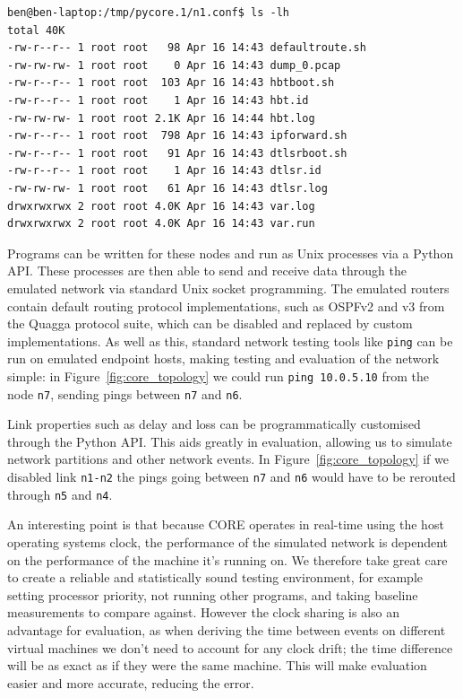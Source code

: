 \documentclass[withindex,glossary,openany]{cam-thesis}
\begin{document}
\begin{minipage}{1\textwidth} \centering
\begin{lstlisting}[label=core_filesystem, frame=tb, caption=Virtualised file-system of the node \texttt{n1}]
ben@ben-laptop:/tmp/pycore.1/n1.conf$ ls -lh
total 40K
-rw-r--r-- 1 root root   98 Apr 16 14:43 defaultroute.sh
-rw-rw-rw- 1 root root    0 Apr 16 14:43 dump_0.pcap
-rw-r--r-- 1 root root  103 Apr 16 14:43 hbtboot.sh
-rw-r--r-- 1 root root    1 Apr 16 14:43 hbt.id
-rw-rw-rw- 1 root root 2.1K Apr 16 14:44 hbt.log
-rw-r--r-- 1 root root  798 Apr 16 14:43 ipforward.sh
-rw-r--r-- 1 root root   91 Apr 16 14:43 dtlsrboot.sh
-rw-r--r-- 1 root root    1 Apr 16 14:43 dtlsr.id
-rw-rw-rw- 1 root root   61 Apr 16 14:43 dtlsr.log
drwxrwxrwx 2 root root 4.0K Apr 16 14:43 var.log
drwxrwxrwx 2 root root 4.0K Apr 16 14:43 var.run
\end{lstlisting}
\end{minipage}

Programs can be written for these nodes and run as Unix processes via a Python API. These processes are then able to send and receive data through the emulated network via standard Unix socket programming. The emulated routers contain default routing protocol implementations, such as OSPFv2 and v3 from the Quagga protocol suite, which can be disabled and replaced by custom implementations. As well as this, standard network testing tools like \texttt{ping} can be run on emulated endpoint hosts, making testing and evaluation of the network simple: in Figure~\ref{fig:core_topology} we could run \texttt{ping 10.0.5.10} from the node \texttt{n7}, sending pings between \texttt{n7} and \texttt{n6}.

Link properties such as delay and loss can be programmatically customised through the Python API. This aids greatly in evaluation, allowing us to simulate network partitions and other network events. In Figure~\ref{fig:core_topology} if we disabled link \texttt{n1-n2} the pings going between \texttt{n7} and \texttt{n6} would have to be rerouted through \texttt{n5} and \texttt{n4}.

An interesting point is that because CORE operates in real-time using the host operating systems clock, the performance of the simulated network is dependent on the performance of the machine it's running on. We therefore take great care to create a reliable and statistically sound testing environment, for example setting processor priority, not running other programs, and taking baseline measurements to compare against. However the clock sharing is also an advantage for evaluation, as when deriving the time between events on different virtual machines we don't need to account for any clock drift; the time difference will be as exact as if they were the same machine. This will make evaluation easier and more accurate, reducing the error.
\end{document}
